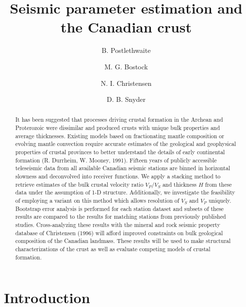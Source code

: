 \documentclass[review]{elsarticle}
\begin{document}
\begin{frontmatter}

\title{Seismic parameter estimation and the Canadian crust}

\author[ubc]{B. Postlethwaite}
\author[ubc]{M. G. Bostock}
\author[ubc]{N. I. Christensen}
\author[gsc]{D. B. Snyder}


\address[ubc]{Earth and Ocean Sciences, UBC, Vancouver BC, Canada}
\address[gsc]{Geological Survey Canada, Natural Resources Canada, Ottawa ON, Canada}

\begin{abstract}
It has been suggested that processes driving crustal formation in the Archean and Proterozoic were dissimilar and produced crusts with unique bulk properties and average thicknesses. Existing models based on fractionating mantle composition or evolving mantle convection require accurate estimates of the geological and geophysical properties of crustal provinces to better understand the details of early continental formation (R. Durrheim, W. Mooney, 1991). Fifteen years of publicly accessible teleseismic data from all available Canadian seismic stations are binned in horizontal slowness and deconvolved into receiver functions. We apply a stacking method to retrieve estimates of the bulk crustal velocity ratio $V_P/V_S$ and thickness $H$ from these data under the assumption of 1-D structure. Additionally, we investigate the feasibility of employing a variant on this method which allows resolution of $V_S$ and $V_P$ uniquely. Bootstrap error analysis is performed for each station dataset and subsets of these results are compared to the results for matching stations from previously published studies. Cross-analyzing these results with the mineral and rock seismic property database of Christensen (1996) will afford improved constraints on bulk geological composition of the Canadian landmass. These results will be used to make structural characterizations of the crust as well as evaluate competing models of crustal formation.
\end{abstract}

\end{frontmatter}
\section{Introduction}
\end{document}
